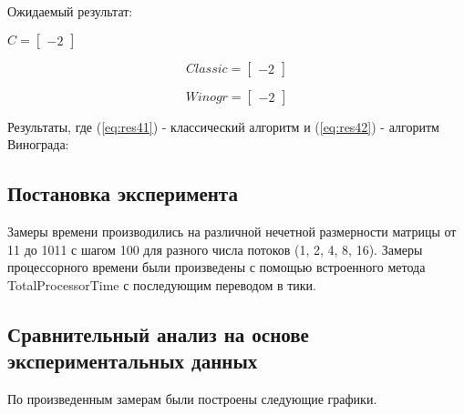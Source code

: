 \documentclass[12pt,a4paper]{scrartcl}
\begin{document}
	Ожидаемый результат:
	
	\begin{center}
		\begin{math}\label{eq:res4}
		C =\begin{bmatrix}
		-2 
		\end{bmatrix}
		\end{math}
	\end{center}
	
	
	
	\begin{center}
		\begin{minipage}[c][3cm][c]{0,3\textwidth}
			\begin{equation}\label{eq:res41}
			Classic =\begin{bmatrix}
			-2 
			\end{bmatrix}
			\end{equation}
		\end{minipage}	
		\begin{minipage}[c][3cm][c]{0,3\textwidth}
			\begin{equation}\label{eq:res42}
			Winogr =\begin{bmatrix}
			-2 
			\end{bmatrix}
			\end{equation}
		\end{minipage}
    \end{center}
    
    Результаты, где (\ref{eq:res41}) - классический алгоритм и (\ref{eq:res42}) - алгоритм Винограда:
	
	
	\newpage
	\subsection{Постановка эксперимента}
	\label{sec:exp:setting}
Замеры времени производились на различной нечетной размерности матрицы от 11 до 1011 с шагом 100 для разного числа потоков (1, 2, 4, 8, 16).
Замеры процессорного времени были произведены с помощью встроенного метода TotalProcessorTime с последующим переводом в тики.

	
	\newpage
	\subsection{Сравнительный анализ на основе экспериментальных данных}
	\label{sec:exp:compare}
	
	По произведенным замерам были построены следующие графики.

\begin{center}
	\centering
	\label{fig:one}
\end{center}
\end{document}
